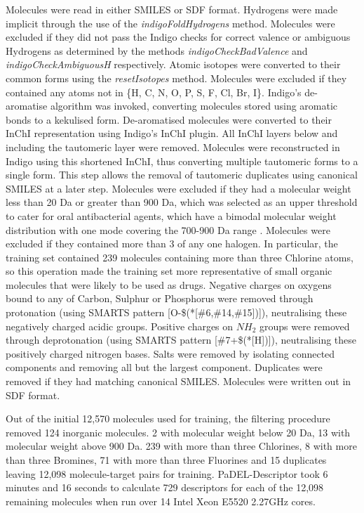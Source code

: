 \documentclass[10pt]{bmc_article}
\newenvironment{bmcformat}{\begin{raggedright}\baselineskip20pt\sloppy\setboolean{publ}{false}}{\end{raggedright}\baselineskip20pt\sloppy}
\begin{document}
\begin{bmcformat}
Molecules were read in either SMILES or SDF format. Hydrogens were made implicit through the use of the \textit{indigoFoldHydrogens} method. Molecules were excluded if they did not pass the Indigo checks for correct valence or ambiguous Hydrogens as determined by the methods \textit{indigoCheckBadValence} and \textit{indigoCheckAmbiguousH} respectively. Atomic isotopes were converted to their common forms using the \textit{resetIsotopes} method. Molecules were excluded if they contained any atoms not in \{H, C, N, O, P, S, F, Cl, Br, I\}. Indigo's de-aromatise algorithm was invoked, converting molecules stored using aromatic bonds to a kekulised form. De-aromatised molecules were converted to their InChI representation \cite{_iupac_????} using Indigo's InChI plugin. All InChI layers below and including the tautomeric layer were removed. Molecules were reconstructed in Indigo using this shortened InChI, thus converting multiple tautomeric forms to a single form. This step allows the removal of tautomeric duplicates using canonical SMILES at a later step. Molecules were excluded if they had a molecular weight less than 20 Da or greater than 900 Da, which was selected as an upper threshold to cater for oral antibacterial agents, which have a bimodal molecular weight distribution with one mode covering the 700-900 Da range \cite{dougherty_antibiotic_2012}. Molecules were excluded if they contained more than 3 of any one halogen. In particular, the training set contained 239 molecules containing more than three Chlorine atoms, so this operation made the training set more representative of small organic molecules that were likely to be used as drugs. Negative charges on oxygens bound to any of Carbon, Sulphur or Phosphorus were removed through protonation (using SMARTS pattern [O-\$(*[\#6,\#14,\#15])]), neutralising these negatively charged acidic groups. Positive charges on $NH_2$ groups were removed through deprotonation (using SMARTS pattern [\#7+\$(*[H])]), neutralising these positively charged nitrogen bases. Salts were removed by isolating connected components and removing all but the largest component. Duplicates were removed if they had matching canonical SMILES. Molecules were written out in SDF format.

Out of the initial 12,570 molecules used for training, the filtering procedure removed 124 inorganic molecules. 2 with molecular weight below 20 Da, 13 with molecular weight above 900 Da. 239 with more than three Chlorines, 8 with more than three Bromines, 71 with more than three Fluorines and 15 duplicates leaving 12,098 molecule-target pairs for training. PaDEL-Descriptor took 6 minutes and 16 seconds to calculate 729 descriptors for each of the 12,098 remaining molecules when run over 14 Intel Xeon E5520 2.27GHz cores.


\end{bmcformat}
\end{document}
